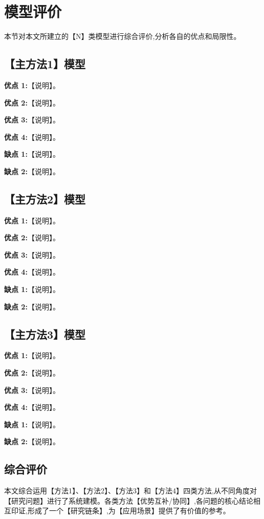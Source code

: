 
\section{模型评价}

本节对本文所建立的【N】类模型进行综合评价,分析各自的优点和局限性。

\subsection{【主方法1】模型}

\textbf{优点 1:}【说明】。

\textbf{优点 2:}【说明】。

\textbf{优点 3:}【说明】。

\textbf{优点 4:}【说明】。

\textbf{缺点 1:}【说明】。

\textbf{缺点 2:}【说明】。

\subsection{【主方法2】模型}

\textbf{优点 1:}【说明】。

\textbf{优点 2:}【说明】。

\textbf{优点 3:}【说明】。

\textbf{优点 4:}【说明】。

\textbf{缺点 1:}【说明】。

\textbf{缺点 2:}【说明】。

\subsection{【主方法3】模型}

\textbf{优点 1:}【说明】。

\textbf{优点 2:}【说明】。

\textbf{优点 3:}【说明】。

\textbf{优点 4:}【说明】。

\textbf{缺点 1:}【说明】。

\textbf{缺点 2:}【说明】。

\subsection{综合评价}

本文综合运用【方法1】、【方法2】、【方法3】和【方法4】四类方法,从不同角度对【研究问题】进行了系统建模。各类方法【优势互补/协同】,各问题的核心结论相互印证,形成了一个【研究链条】,为【应用场景】提供了有价值的参考。
